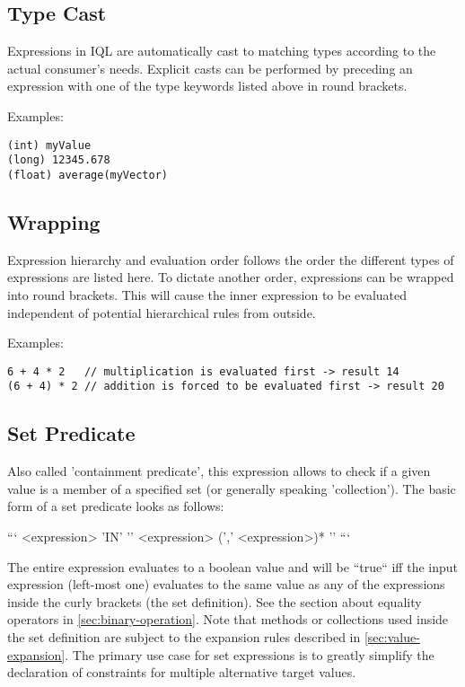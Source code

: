 \documentclass[11pt]{article}
\begin{document}
\subsection{Type Cast}
\label{sec:type-cast}

Expressions in IQL are automatically cast to matching types according to the actual consumer's needs. Explicit casts can be performed by preceding an expression with one of the type keywords listed above in round brackets.

Examples:

\begin{verbatim}
(int) myValue
(long) 12345.678
(float) average(myVector)
\end{verbatim}

\subsection{Wrapping}
\label{sec:wrapping}

Expression hierarchy and evaluation order follows the order the different types of expressions are listed here. To dictate another order, expressions can be wrapped into round brackets. This will cause the inner expression to be evaluated independent of potential hierarchical rules from outside.

Examples:

\begin{verbatim}
6 + 4 * 2   // multiplication is evaluated first -> result 14
(6 + 4) * 2 // addition is forced to be evaluated first -> result 20
\end{verbatim}

\subsection{Set Predicate}
\label{sec:set-predicate}

Also called 'containment predicate', this expression allows to check if a given value is a member of a specified set (or generally speaking 'collection'). The basic form of a set predicate looks as follows:

```
<expression> 'IN' '{' <expression> (',' <expression>)* '}' 
```

The entire expression evaluates to a boolean value and will be ``true`` iff the input expression (left-most one) evaluates to the same value as any of the expressions inside the curly brackets (the set definition). See the section about equality operators in \cref{sec:binary-operation}. Note that methods or collections used inside the set definition are subject to the expansion rules described in \cref{sec:value-expansion}. The primary use case for set expressions is to greatly simplify the declaration of constraints for multiple alternative target values. 
\end{document}
